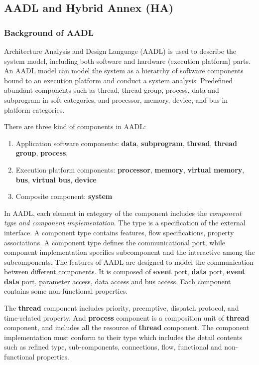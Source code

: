 \subsection{AADL and Hybrid Annex (HA)}
\subsubsection{Background of AADL}
Architecture Analysis and Design Language (AADL) is used to describe the system model, including both software and hardware (execution platform) parts. An AADL model can model the system as a hierarchy of software components bound to an execution platform and conduct a system analysis. Predefined abundant components such as thread, thread group, process, data and subprogram in soft categories, and processor, memory, device, and bus in platform categories. 

There are three kind of components in AADL:
\begin{enumerate}
\item Application software components: \textbf{data}, \textbf{subprogram}, \textbf{thread}, \textbf{thread group}, \textbf{process}, 
\item Execution platform components: \textbf{processor}, \textbf{memory}, \textbf{virtual memory}, \textbf{bus}, \textbf{virtual bus}, \textbf{device}
\item Composite component: \textbf{system}
\end{enumerate}

In AADL, each element in category of the component includes the \textit{component type and component implementation}. The type is a specification of the external interface. A component type contains features, flow specifications, property associations. A component type defines the communicational port, while component implementation specifies subcomponent and the interactive among the subcomponents. The features of AADL are designed to model the communication between different components. It is composed of \textbf{event} port, \textbf{data} port, \textbf{event data} port, parameter access, data access and bus access. Each component contains some non-functional properties.

The \textbf{thread} component includes priority, preemptive, dispatch protocol, and time-related property. And \textbf{process} component is a composition unit of \textbf{thread} component, and includes all the resource of \textbf{thread} component. The component implementation must conform to their type which includes the detail contents such as refined type, sub-components, connections, flow, functional and non-functional properties. 



